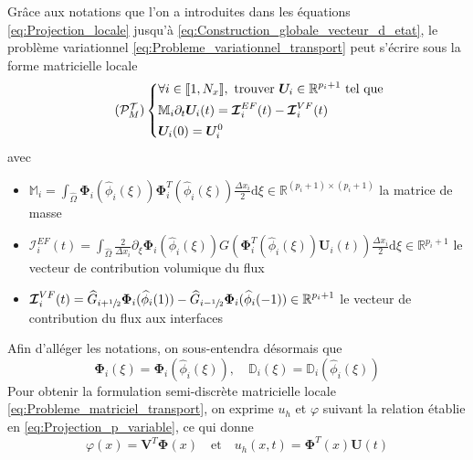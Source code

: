 \documentclass[11pt, a4paper, oneside]{report}
\begin{document}
Grâce aux notations que l'on a introduites dans les équations \eqref{eq:Projection_locale} jusqu'à \eqref{eq:Construction_globale_vecteur_d_etat}, le problème variationnel \eqref{eq:Probleme_variationnel_transport} peut s'écrire sous la forme matricielle locale
\begin{equation} \tag{$\mathcal{P}_M^\mathcal{T}$} \label{eq:Probleme_matriciel_transport}
    \left \{
    \begin{aligned}
        & \forall i \in \llbracket 1, N_x \rrbracket, \text{ trouver } \bm{U}_{i} \in \mathbb{R}^{p_i + 1} \text{ tel que} \\
        &\mathbb{M}_i \partial_t \bm{U}_i(t) = \bm{\mathcal{I}}_i^{EF}(t) - \bm{\mathcal{I}}_i^{VF}(t) \\
        &\bm{U}_i(0) = \bm{U}_i^0
    \end{aligned}
    \right .
\end{equation}
avec
\begin{itemize}
    \item $\displaystyle \mathbb{M}_i = \int_{\widehat{\Omega}} \bm{\Phi}_i (\widehat{\phi}_i(\xi)) \bm{\Phi}_i^T(\widehat{\phi}_i(\xi)) \frac{\Delta x_i}{2} \text{d}\xi \in \mathbb{R}^{(p_i+1) \times (p_i+1)}$ la matrice de masse
    \item $\displaystyle \bm{\mathcal{I}}_i^{EF}(t) = \int_{\widehat{\Omega}} \frac{2}{\Delta x_i} \partial_\xi \bm{\Phi}_i(\widehat{\phi}_i(\xi)) G \left( \bm{\Phi}_i^T(\widehat{\phi}_i(\xi)) \bm{U}_i(t) \right) \frac{\Delta x_i}{2} \text{d}\xi \in \mathbb{R}^{p_i+1}$ le vecteur de contribution volumique du flux
    \item $\displaystyle \bm{\mathcal{I}}_i^{VF}(t) = \widehat{G}_{i + \sfrac{1}{2}} \bm{\Phi}_i(\widehat{\phi}_i(1)) - \widehat{G}_{i-\sfrac{1}{2}} \bm{\Phi}_i(\widehat{\phi}_i(-1)) \in \mathbb{R}^{p_i+1}$ le vecteur de contribution du flux aux interfaces
\end{itemize}
Afin d'alléger les notations, on sous-entendra désormais que
\begin{equation}
    \bm{\Phi}_i(\xi) = \bm{\Phi}_i(\widehat{\phi}_i(\xi)), \quad \mathbb{D}_i(\xi) = \mathbb{D}_i(\widehat{\phi}_i(\xi))
\end{equation}
Pour obtenir la formulation semi-discrète matricielle locale \eqref{eq:Probleme_matriciel_transport}, on exprime $u_h$ et $\varphi$ suivant la relation établie en \eqref{eq:Projection_p_variable}, ce qui donne
\begin{equation}
    \varphi(x) = \bm{V}^T \bm{\Phi}(x) \quad \text{et} \quad u_h(x, t) = \bm{\Phi}^T(x) \bm{U}(t)
\end{equation}
\end{document}
